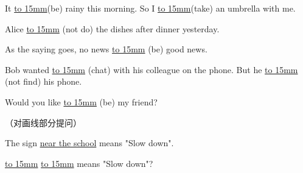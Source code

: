 
\item{
    It \underline{\hbox to 15mm{}}(be) rainy this morning. So I \underline{\hbox to 15mm{}}(take) an umbrella with me.
}
\\
\item{
    Alice \underline{\hbox to 15mm{}} (not do) the dishes after dinner yesterday.
}
\\
\item{
    As the saying goes, no news \underline{\hbox to 15mm{}} (be) good news.
}
\\
\item{
    Bob wanted \underline{\hbox to 15mm{}} (chat) with his colleague on the phone. But he \underline{\hbox to 15mm{}} (not find) his phone.
}
\\
\item{
    Would you like \underline{\hbox to 15mm{}} (be) my friend?
}
\\
\item{
    （对画线部分提问）

    The sign \underline{near the school} means "Slow down".

    \underline{\hbox to 15mm{}} \underline{\hbox to 15mm{}} means "Slow down"?
}
